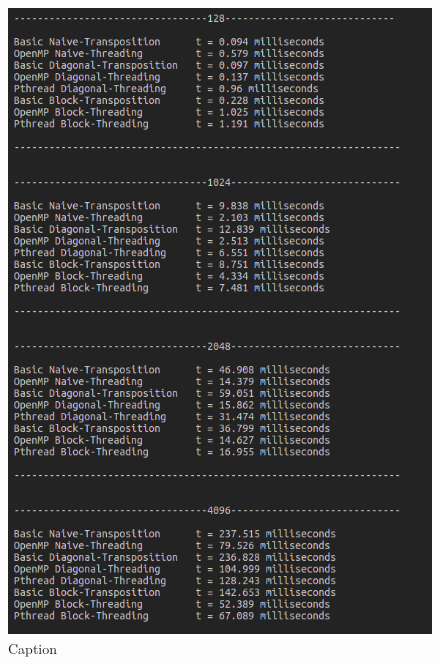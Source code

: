 \documentclass[conference]{IEEEtran}
\begin{document}
\begin{figure}[h!]
    \centering
    \includegraphics[scale = 0.6]{3b.png}
    \caption{Caption}
    \label{fig:my_label}
\end{figure}
\end{document}
